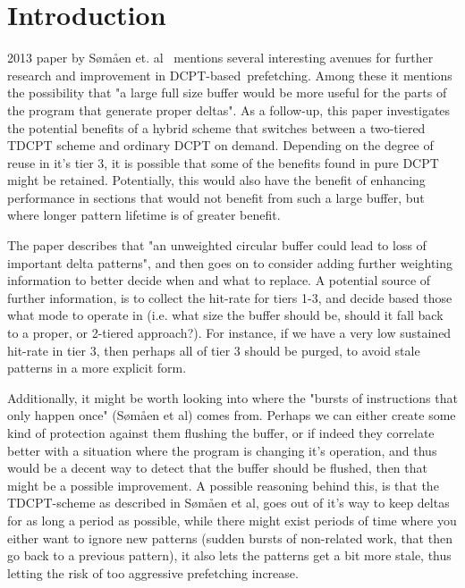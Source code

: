 \section{Introduction}

 2013 paper by Sømåen et. al~\cite{Somaen} mentions several
interesting avenues for further research and improvement in
DCPT-based~\footnotemark[1] prefetching. Among these it mentions the
possibility that "a large full size buffer would be more useful for the parts
of the program that generate proper deltas". As a follow-up, this paper
investigates the potential benefits of a hybrid scheme that switches between a
two-tiered TDCPT scheme and ordinary DCPT on demand. Depending on the degree of
reuse in it's tier 3, it is possible that some of the benefits found in pure
DCPT might be retained. Potentially, this would also have the benefit of
enhancing performance in sections that would not benefit from such a large
buffer, but where longer pattern lifetime is of greater benefit.


The paper describes that "an unweighted circular buffer could lead to loss of important
delta patterns", and then goes on to consider adding further
weighting information to better decide when and what to replace. A potential source
of further information, is to collect the hit-rate for tiers 1-3, and decide based 
those what mode to operate in (i.e. what size the buffer should be, should it fall 
back to a proper, or 2-tiered approach?). For instance, if we have a very low
sustained hit-rate in tier 3, then perhaps all of tier 3 should be purged, to avoid
stale patterns in a more explicit form.

Additionally, it might be worth looking into where the "bursts of instructions that
only happen once" (Sømåen et al) comes from. Perhaps we can either create some kind
of protection against them flushing the buffer, or if indeed they correlate better
with a situation where the program is changing it's operation, and thus would be
a decent way to detect that the buffer should be flushed, then that might be a
possible improvement. A possible reasoning behind this, is that the TDCPT-scheme as
described in Sømåen et al, goes out of it's way to keep deltas for as long a period
as possible, while there might exist periods of time where you either want to
ignore new patterns (sudden bursts of non-related work, that then go back to a
previous pattern), it also lets the patterns get a bit more stale, thus letting the
risk of too aggressive prefetching increase.

